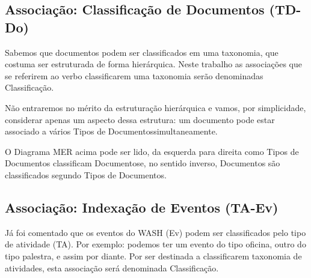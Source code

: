 \documentclass[
12pt,		%
openright,	%
twoside,  %
a4paper,			%
chapter=TITLE,		%
english,			%
french,				%
spanish,			%
brazil				%
]{USPSC-classe/USPSC}
\begin{document}
\subsection[Associa\c{c}\~ao: Classifica\c{c}\~ao de Documentos (TD-Do)]{Associa\c{c}\~ao: Classifica\c{c}\~ao de Documentos (TD-Do)}\label{Associa\c{c}\~ao: Classifica\c{c}\~ao de Documentos (TD-Do)}
Sabemos que documentos podem ser classificados em uma taxonomia, que costuma ser estruturada de forma hier\'arquica. Neste trabalho as associa\c{c}\~oes que se referirem ao verbo \textquotedbl classificar\textquotedbl  em uma taxonomia ser\~ao denominadas \textquotedbl Classifica\c{c}\~ao\textquotedbl .










N\~ao entraremos no m\'erito da estrutura\c{c}\~ao hier\'arquica e vamos, por simplicidade, considerar apenas um aspecto dessa estrutura: um documento pode estar associado a v\'arios \textquotedbl Tipos de Documentos\textquotedbl  simultaneamente.












O Diagrama MER acima pode ser lido, da esquerda para direita como \textquotedbl Tipos de Documentos classificam Documentos\textquotedbl  e, no sentido inverso, \textquotedbl Documentos s\~ao classificados segundo Tipos de Documentos\textquotedbl .










\subsection[Associa\c{c}\~ao: Indexa\c{c}\~ao de Eventos (TA-Ev)]{Associa\c{c}\~ao: Indexa\c{c}\~ao de Eventos (TA-Ev)}\label{Associa\c{c}\~ao: Indexa\c{c}\~ao de Eventos (TA-Ev)}
J\'a foi comentado que os eventos do WASH (Ev) podem ser classificados pelo tipo de atividade (TA). Por exemplo: podemos ter um evento do tipo oficina, outro do tipo palestra, e assim por diante. Por ser destinada a \textquotedbl classificar\textquotedbl  em taxonomia de atividades, esta associa\c{c}\~ao ser\'a denominada \textquotedbl Classifica\c{c}\~ao\textquotedbl .
\end{document}
